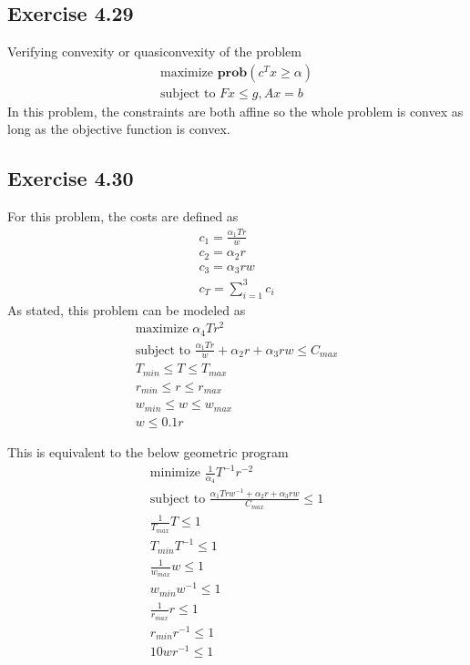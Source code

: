 \subsection{Exercise 4.29}
Verifying convexity or quasiconvexity of the problem 
\begin{equation}
  \begin{aligned}
    \text{maximize } \textbf{prob}(c^T x \geq \alpha) \\
    \text{subject to } Fx \leq g, Ax = b
  \end{aligned}
\end{equation}
In this problem, the constraints are both affine so the whole problem is convex as long as the objective function is convex.

\subsection{Exercise 4.30}
For this problem, the costs are defined as 
\begin{equation}
  \begin{aligned}
    c_1 = \frac{\alpha_1 T r}{w} \\
    c_2 = \alpha_2 r \\
    c_3 = \alpha_3 r w \\
    c_T = \sum_{i=1}^{3}c_i
  \end{aligned}
\end{equation}
As stated, this problem can be modeled as 
\begin{equation}
  \begin{aligned}
    \text{maximize } \alpha_4 T r^2 \\
    \text{subject to } \frac{\alpha_1 T r}{w} + \alpha_2 r + \alpha_3 r w \leq C_{max} \\
    T_{min} \leq T \leq T_{max} \\
    r_{min} \leq r \leq r_{max} \\
    w_{min} \leq w \leq w_{max} \\
    w \leq 0.1r
  \end{aligned}
\end{equation}

This is equivalent to the below geometric program
\begin{equation}
  \begin{aligned}
    \text{minimize } \frac{1}{\alpha_4} T^{-1} r^{-2} \\
    \text{subject to } \frac{\alpha_1 T r w^{-1} + \alpha_2 r + \alpha_3 r w}{C_{max}}\leq  1\\
    \frac{1}{T_{max}} T  \leq 1 \\
    T_{min} T^{-1}\leq 1 \\
    \frac{1}{w_{max}} w  \leq 1 \\
    w_{min} w^{-1} \leq 1 \\
    \frac{1}{r_{max}} r  \leq 1 \\
    r_{min} r^{-1}\leq 1 \\
    10wr^{-1} \leq 1
  \end{aligned}
\end{equation}

